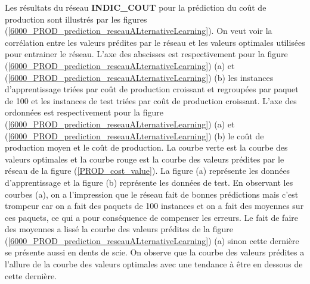Les résultats du réseau \textbf{INDIC\_COUT} pour la prédiction du coût de production sont illustrés par les figures  (\ref{6000_PROD_prediction_reseauALternativeLearning}). On veut voir la corrélation entre les valeurs prédites par le réseau et les valeurs optimales utilisées pour entrainer le réseau. L'axe des abscisses est respectivement pour la figure (\ref{6000_PROD_prediction_reseauALternativeLearning}) (a) et (\ref{6000_PROD_prediction_reseauALternativeLearning}) (b) les instances d'apprentissage triées par coût de production croissant et regroupées par paquet de 100 et les instances de test triées par coût de production croissant. L'axe des ordonnées est respectivement pour la figure (\ref{6000_PROD_prediction_reseauALternativeLearning}) (a) et (\ref{6000_PROD_prediction_reseauALternativeLearning}) (b) le coût de production moyen et le coût de production. La courbe verte est la courbe des valeurs optimales et la courbe rouge est la courbe des valeurs prédites par le réseau de la figure (\ref{PROD_cost_value}). La figure (a) représente les données d'apprentissage et la figure (b) représente les données de test. En observant les courbes (a), on a l'impression que le réseau fait de bonnes prédictions mais c'est trompeur car on a fait des paquets de 100 instances et on a fait des moyennes sur ces paquets, ce qui a pour conséquence de compenser les erreurs. Le fait de faire des moyennes a lissé la courbe des valeurs prédites de la figure (\ref{6000_PROD_prediction_reseauALternativeLearning}) (a) sinon cette dernière se présente aussi en dents de scie. On observe que la courbe des valeurs prédites a l'allure de la courbe des valeurs optimales avec une tendance à être en dessous de cette dernière.




